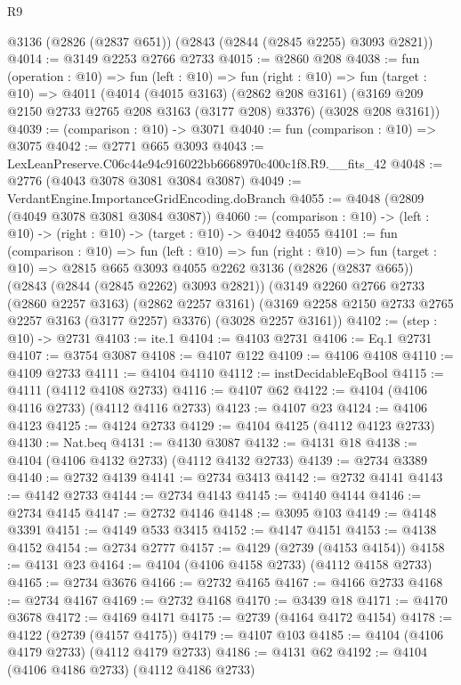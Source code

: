 \begin{lexlean}{R9}
\begin{coremodule}
    @3136
    (@2826 (@2837 @651))
    (@2843 (@2844 (@2845 @2255) @3093 @2821))
@4014 := @3149 @2253 @2766 @2733
@4015 := @2860 @208
@4038 := fun (operation : @10) =>
  fun (left : @10) =>
  fun (right : @10) =>
  fun (target : @10) =>
  @4011
    (@4014
      (@4015 @3163)
      (@2862 @208 @3161)
      (@3169 @209 @2150 @2733 @2765 @208 @3163 (@3177 @208) @3376)
      (@3028 @208 @3161))
@4039 := (comparison : @10) -> @3071
@4040 := fun (comparison : @10) => @3075
@4042 := @2771 @665 @3093
@4043 := LexLeanPreserve.C06c44e94c916022bb6668970c400c1f8.R9.__fits_42
@4048 := @2776 (@4043 @3078 @3081 @3084 @3087)
@4049 := VerdantEngine.ImportanceGridEncoding.doBranch
@4055 := @4048 (@2809 (@4049 @3078 @3081 @3084 @3087))
@4060 := (comparison : @10) -> (left : @10) -> (right : @10) -> (target : @10) -> @4042 @4055
@4101 := fun (comparison : @10) =>
  fun (left : @10) =>
  fun (right : @10) =>
  fun (target : @10) =>
  @2815
    @665
    @3093
    @4055
    @2262
    @3136
    (@2826 (@2837 @665))
    (@2843 (@2844 (@2845 @2262) @3093 @2821))
    (@3149
      @2260
      @2766
      @2733
      (@2860 @2257 @3163)
      (@2862 @2257 @3161)
      (@3169 @2258 @2150 @2733 @2765 @2257 @3163 (@3177 @2257) @3376)
      (@3028 @2257 @3161))
@4102 := (step : @10) -> @2731
@4103 := ite.{1}
@4104 := @4103 @2731
@4106 := Eq.{1} @2731
@4107 := @3754 @3087
@4108 := @4107 @122
@4109 := @4106 @4108
@4110 := @4109 @2733
@4111 := @4104 @4110
@4112 := instDecidableEqBool
@4115 := @4111 (@4112 @4108 @2733)
@4116 := @4107 @62
@4122 := @4104 (@4106 @4116 @2733) (@4112 @4116 @2733)
@4123 := @4107 @23
@4124 := @4106 @4123
@4125 := @4124 @2733
@4129 := @4104 @4125 (@4112 @4123 @2733)
@4130 := Nat.beq
@4131 := @4130 @3087
@4132 := @4131 @18
@4138 := @4104 (@4106 @4132 @2733) (@4112 @4132 @2733)
@4139 := @2734 @3389
@4140 := @2732 @4139
@4141 := @2734 @3413
@4142 := @2732 @4141
@4143 := @4142 @2733
@4144 := @2734 @4143
@4145 := @4140 @4144
@4146 := @2734 @4145
@4147 := @2732 @4146
@4148 := @3095 @103
@4149 := @4148 @3391
@4151 := @4149 @533 @3415
@4152 := @4147 @4151
@4153 := @4138 @4152
@4154 := @2734 @2777
@4157 := @4129 (@2739 (@4153 @4154))
@4158 := @4131 @23
@4164 := @4104 (@4106 @4158 @2733) (@4112 @4158 @2733)
@4165 := @2734 @3676
@4166 := @2732 @4165
@4167 := @4166 @2733
@4168 := @2734 @4167
@4169 := @2732 @4168
@4170 := @3439 @18
@4171 := @4170 @3678
@4172 := @4169 @4171
@4175 := @2739 (@4164 @4172 @4154)
@4178 := @4122 (@2739 (@4157 @4175))
@4179 := @4107 @103
@4185 := @4104 (@4106 @4179 @2733) (@4112 @4179 @2733)
@4186 := @4131 @62
@4192 := @4104 (@4106 @4186 @2733) (@4112 @4186 @2733)

\end{coremodule}
\end{lexlean}
